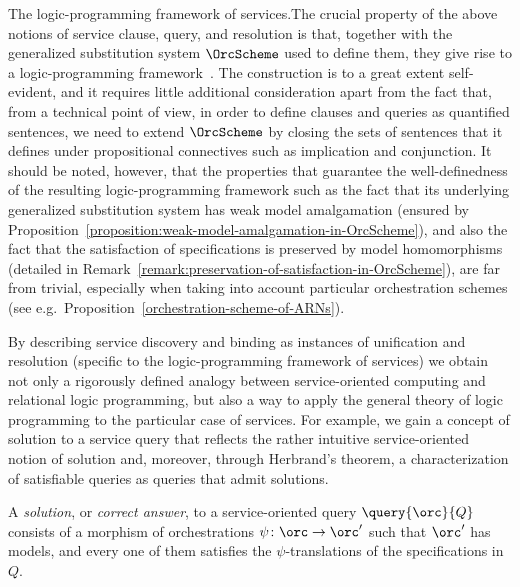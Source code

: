 \documentclass{LMCS}
\begin{document}
  \begin{minisection}{The logic-programming framework of services.}The crucial property of the above notions of service clause, query, and resolution is that, together with the generalized substitution system \(\OrcScheme\) used to define them, they give rise to a logic-programming framework~\cite{Tutu-Fiadeiro:Institution-independent-logic-programming-2015}.
    The construction is to a great extent self-evident, and it requires little additional consideration apart from the fact that, from a technical point of view, in order to define clauses and queries as quantified sentences, we need to extend \(\OrcScheme\) by closing the sets of sentences that it defines under propositional connectives such as implication and conjunction.
    It should be noted, however, that the properties that guarantee the well-definedness of the resulting logic-programming framework such as the fact that its underlying generalized substitution system has weak model amalgamation (ensured by Proposition~\ref{proposition:weak-model-amalgamation-in-OrcScheme}), and also the fact that the satisfaction of specifications is preserved by model homomorphisms (detailed in Remark~\ref{remark:preservation-of-satisfaction-in-OrcScheme}), are far from trivial, especially when taking into account particular orchestration schemes (see e.g.\ Proposition~\ref{orchestration-scheme-of-ARNs}).
\end{minisection}

  By describing service discovery and binding as instances of unification and resolution (specific to the logic-programming framework of services) we obtain not only a rigorously defined analogy between service-oriented computing and relational logic programming, but also a way to apply the general theory of logic programming to the particular case of services.
  For example, we gain a concept of solution to a service query that reflects the rather intuitive service-oriented notion of solution and, moreover, through Herbrand's theorem, a characterization of satisfiable queries as queries that admit solutions.

  \begin{defi}[Solution]
    A \emph{solution}, or \emph{correct answer}, to a service-oriented query \(\query{\orc}{Q}\) consists of a morphism of orchestrations \(\psi \colon \orc \to \orc'\) such that \(\orc'\) has models, and every one of them satisfies the \(\psi\)\nb-translations of the specifications in \(Q\).
  \end{defi}
\end{document}
